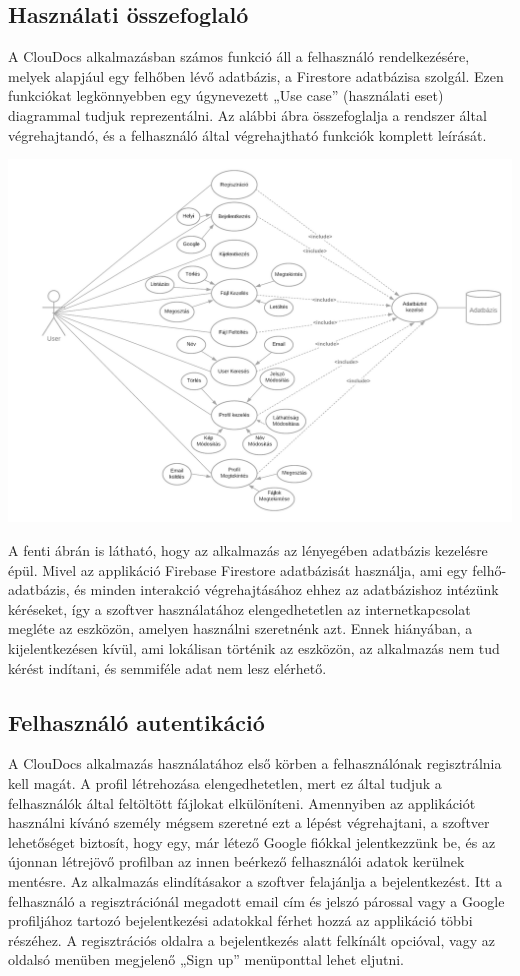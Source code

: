 \documentclass[12pt]{report}
\begin{document}
\subsection{Használati összefoglaló}
A ClouDocs alkalmazásban számos funkció áll a felhasználó rendelkezésére, melyek alapjául egy felhőben lévő adatbázis, a Firestore adatbázisa szolgál. Ezen funkciókat legkönnyebben egy úgynevezett „Use case” (használati eset) diagrammal tudjuk reprezentálni. Az alábbi ábra összefoglalja a rendszer által végrehajtandó, és a felhasználó által végrehajtható funkciók komplett leírását.

\begin{center}
	\includegraphics[width=150mm,scale=0.5,]{usecase.png}
\end{center}

A fenti ábrán is látható, hogy az alkalmazás az lényegében adatbázis kezelésre épül. Mivel az applikáció Firebase Firestore adatbázisát használja, ami egy felhő-adatbázis, és minden interakció végrehajtásához ehhez az adatbázishoz intézünk kéréseket, így a szoftver használatához elengedhetetlen az internetkapcsolat megléte az eszközön, amelyen használni szeretnénk azt. Ennek hiányában, a kijelentkezésen kívül, ami lokálisan történik az eszközön, az alkalmazás nem tud kérést indítani, és semmiféle adat nem lesz elérhető.

\subsection{Felhasználó autentikáció}
A ClouDocs alkalmazás használatához első körben a felhasználónak regisztrálnia kell magát. A profil létrehozása elengedhetetlen, mert ez által tudjuk a felhasználók által feltöltött fájlokat elkülöníteni. Amennyiben az applikációt használni kívánó személy mégsem szeretné ezt a lépést végrehajtani, a szoftver lehetőséget biztosít, hogy egy, már létező Google fiókkal jelentkezzünk be, és az újonnan létrejövő profilban az innen beérkező felhasználói adatok kerülnek mentésre. Az alkalmazás elindításakor a szoftver felajánlja a bejelentkezést. Itt a felhasználó a regisztrációnál megadott email cím és jelszó párossal vagy a Google profiljához tartozó bejelentkezési adatokkal férhet hozzá az applikáció többi részéhez. A regisztrációs oldalra a bejelentkezés alatt felkínált opcióval, vagy az oldalsó menüben megjelenő „Sign up” menüponttal lehet eljutni.
\end{document}
